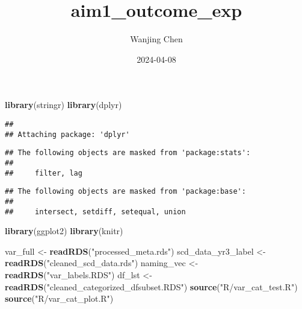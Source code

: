 \documentclass[
]{article}
\title{aim1\_outcome\_exp}
\author{Wanjing Chen}
\date{2024-04-08}
\newenvironment{Shaded}{\begin{snugshade}}{\end{snugshade}}
\newcommand{\FunctionTok}[1]{\textcolor[rgb]{0.13,0.29,0.53}{\textbf{#1}}}
\newcommand{\NormalTok}[1]{#1}
\newcommand{\OtherTok}[1]{\textcolor[rgb]{0.56,0.35,0.01}{#1}}
\newcommand{\StringTok}[1]{\textcolor[rgb]{0.31,0.60,0.02}{#1}}
\begin{document}
\maketitle

\begin{Shaded}
\begin{Highlighting}[]
\FunctionTok{library}\NormalTok{(stringr)}
\FunctionTok{library}\NormalTok{(dplyr)}
\end{Highlighting}
\end{Shaded}

\begin{verbatim}
## 
## Attaching package: 'dplyr'
\end{verbatim}

\begin{verbatim}
## The following objects are masked from 'package:stats':
## 
##     filter, lag
\end{verbatim}

\begin{verbatim}
## The following objects are masked from 'package:base':
## 
##     intersect, setdiff, setequal, union
\end{verbatim}

\begin{Shaded}
\begin{Highlighting}[]
\FunctionTok{library}\NormalTok{(ggplot2)}
\FunctionTok{library}\NormalTok{(knitr)}
\end{Highlighting}
\end{Shaded}

\begin{Shaded}
\begin{Highlighting}[]
\NormalTok{var\_full }\OtherTok{\textless{}{-}} \FunctionTok{readRDS}\NormalTok{(}\StringTok{"processed\_meta.rds"}\NormalTok{)}
\NormalTok{scd\_data\_yr3\_label }\OtherTok{\textless{}{-}} \FunctionTok{readRDS}\NormalTok{(}\StringTok{"cleaned\_scd\_data.rds"}\NormalTok{)}
\NormalTok{naming\_vec }\OtherTok{\textless{}{-}} \FunctionTok{readRDS}\NormalTok{(}\StringTok{"var\_labels.RDS"}\NormalTok{)}
\NormalTok{df\_lst }\OtherTok{\textless{}{-}} \FunctionTok{readRDS}\NormalTok{(}\StringTok{"cleaned\_categorized\_dfsubset.RDS"}\NormalTok{)}
\FunctionTok{source}\NormalTok{(}\StringTok{"R/var\_cat\_test.R"}\NormalTok{)}
\FunctionTok{source}\NormalTok{(}\StringTok{"R/var\_cat\_plot.R"}\NormalTok{)}
\end{Highlighting}
\end{Shaded}
\end{document}
